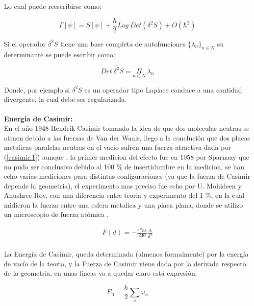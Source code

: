 Lo cual puede reescribirse como:

\begin{equation}
\Gamma [\psi] = S [\psi] + \frac{\hbar}{2} Log \ Det ( \delta ^2 S ) +
O ( \hbar ^2 )
\end{equation}


Si el operador $ \delta ^2 S $ tiene una base completa de autofunciones $ \{ \lambda _n \} _{n \in N}$ su determinante se puede escribir como:

\begin{equation}
Det \ \delta ^2 S = \underset{ n \in N }{ \Pi } \ \lambda _n
\end{equation}

Donde, por ejemplo si $\delta ^2 S$ es un operador tipo Laplace conduce a una cantidad divergente, la cual debe ser regularizada.\\ \\



\textbf{Energía de Casimir:} \\ 

En el año 1948 Hendrik Casimir tomando la idea de que dos moleculas neutras se atraen debido a las fuerzas de Van der Waals, llego a la conclución que dos placas metalicas paralelas neutras en el vacio sufren una fuerza atractiva dada por (\ref{casimir.1}) aunque , la primer medicion del efecto fue en 1958 por Sparnaay que no pudo ser conclusivo debido al 100 \% de insertidumbre en la medicion, se han echo varias mediciones para distintas configuraciones (ya que la fuerza de Casimir depende la geometria), el experimento mas preciso fue echo por U. Mohideen y Anushree Roy, con una diferencia entre teoria y experimento del 1 \%, en la cual midieron la fuerza entre una esfera metalica y una placa plana, donde se utilizo un microscopio de fuerza atómica \cite{BORDAG20011} .


\begin{equation}
\begin{array}{c}
F(d) = - \frac{\pi ^2 \hbar c}{240} \frac{A}{d^4} \\
\end{array} 
\label{casimir.1}
\end{equation}

La Energía de Casimir, queda determinada (almenos formalmente) por la energía de vacío de la teoria, y la Fuerza de Casimir viene dada por la derivada respecto de la geometría, en unas lineas va a quedar claro está expresión.

\begin{equation}
E _0 = \frac{\hbar}{2} \sum _n \omega _n
\end{equation}


